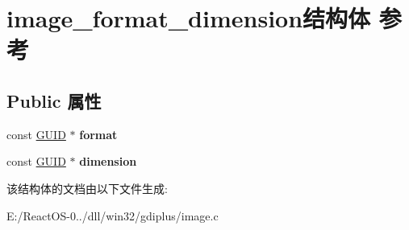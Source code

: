 \hypertarget{structimage__format__dimension}{}\section{image\+\_\+format\+\_\+dimension结构体 参考}
\label{structimage__format__dimension}
\subsection*{Public 属性}
\begin{DoxyCompactItemize}
\item 
\mbox{\label{structimage__format__dimension_a61fcfb298328bce88bd6e5870e8a2bf0}} 
const \hyperlink{interface_g_u_i_d}{G\+U\+ID} $\ast$ {\bfseries format}
\item 
\mbox{\label{structimage__format__dimension_a867561483cdc10cc8153ae476349da8c}} 
const \hyperlink{interface_g_u_i_d}{G\+U\+ID} $\ast$ {\bfseries dimension}
\end{DoxyCompactItemize}


该结构体的文档由以下文件生成\+:\begin{DoxyCompactItemize}
\item 
E\+:/\+React\+O\+S-\/0../dll/win32/gdiplus/image.\+c\end{DoxyCompactItemize}
